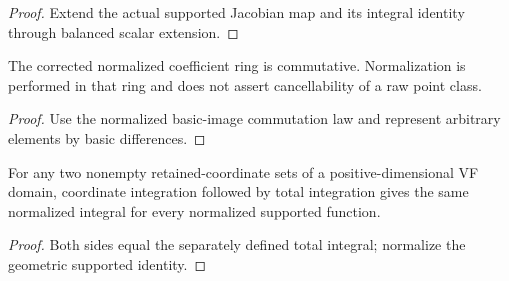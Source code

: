\begin{proof}


\leanok

Extend the actual supported Jacobian map and its integral identity through balanced scalar extension.

\end{proof}

\begin{lemma}

\label{s7-normalized}


\leanok

The corrected normalized coefficient ring is commutative. Normalization is performed in that ring and does not assert cancellability of a raw point class.

\end{lemma}

\begin{proof}


\leanok

Use the normalized basic-image commutation law and represent arbitrary elements by basic differences.

\end{proof}

\begin{theorem}

\label{s7-14}


\leanok

For any two nonempty retained-coordinate sets of a positive-dimensional VF domain, coordinate integration followed by total integration gives the same normalized integral for every normalized supported function.

\end{theorem}

\begin{proof}


\leanok

Both sides equal the separately defined total integral; normalize the geometric supported identity.

\end{proof}

